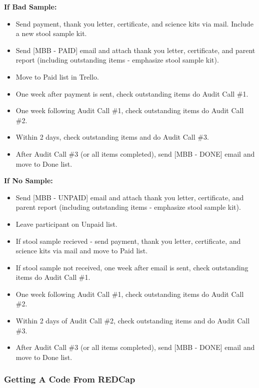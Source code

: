 \documentclass[]{book}
\providecommand{\tightlist}{%
  \setlength{\itemsep}{0pt}\setlength{\parskip}{0pt}}
\begin{document}
\textbf{If Bad Sample:}

\begin{itemize}
\tightlist
\item
  Send payment, thank you letter, certificate, and science kits via mail. Include a new stool sample kit.
\item
  Send {[}MBB - PAID{]} email and attach thank you letter, certificate, and parent report (including outstanding items - emphasize stool sample kit).
\item
  Move to Paid list in Trello.
\item
  One week after payment is sent, check outstanding items do Audit Call \#1.
\item
  One week following Audit Call \#1, check outstanding items do Audit Call \#2.
\item
  Within 2 days, check outstanding items and do Audit Call \#3.
\item
  After Audit Call \#3 (or all items completed), send {[}MBB - DONE{]} email and move to Done list.
\end{itemize}

\textbf{If No Sample:}

\begin{itemize}
\tightlist
\item
  Send {[}MBB - UNPAID{]} email and attach thank you letter, certificate, and parent report (including outstanding items - emphasize stool sample kit).
\item
  Leave participant on Unpaid list.
\item
  If stool sample recieved - send payment, thank you letter, certificate, and science kits via mail and move to Paid list.
\item
  If stool sample not received, one week after email is sent, check outstanding items do Audit Call \#1.
\item
  One week following Audit Call \#1, check outstanding items do Audit Call \#2.
\item
  Within 2 days of Audit Call \#2, check outstanding items and do Audit Call \#3.
\item
  After Audit Call \#3 (or all items completed), send {[}MBB - DONE{]} email and move to Done list.
\end{itemize}

\hypertarget{getting-a-code-from-redcap}{%
\subsubsection{Getting A Code From REDCap}\label{getting-a-code-from-redcap}}
\end{document}
